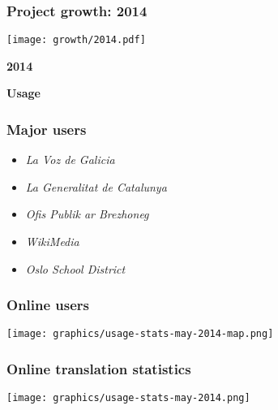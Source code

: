 \documentclass[10pt,xetex]{beamer} %
\begin{document}
\begin{frame}
  \frametitle{Project growth: 2014}
\parbox{0.8\textwidth}{\texttt{[image: growth/2014.pdf]}}\parbox{0.2\textwidth}{{\bf 2014}}

\end{frame}


\begin{frame} %
 \begin{center}
 {\Large {\bf Usage}}
 \end{center}
\end{frame}

\begin{frame}
   \frametitle{Major users}

   \begin{itemize}
     \item \emph{La Voz de Galicia}
     \item \emph{La Generalitat de Catalunya}
     \item \emph{Ofis Publik ar Brezhoneg}
     \item \emph{WikiMedia}
     \item \emph{Oslo School District}
   \end{itemize}


\end{frame}


\begin{frame}
    \frametitle{Online users}
    \begin{center}
      \texttt{[image: graphics/usage-stats-may-2014-map.png]}
    \end{center}


\end{frame}

\begin{frame}
    \frametitle{Online translation statistics}
    \begin{center}
      \texttt{[image: graphics/usage-stats-may-2014.png]}
    \end{center}

\end{frame}
\end{document}
